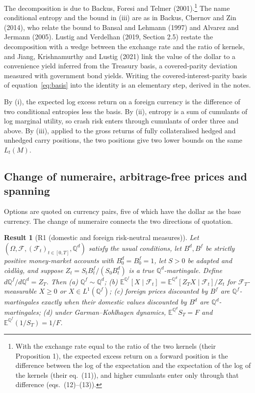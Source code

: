 \documentclass[11pt]{article}
\theoremstyle{result}
\newtheorem*{result}{Result}
\newcommand{\E}{\mathbb{E}}
\newcommand{\Q}{\mathbb{Q}}
\begin{document}
The decomposition is due to Backus, Foresi and Telmer (2001).\footnote{With the exchange rate equal to the ratio of the two kernels (their Proposition 1), the expected excess return on a forward position is the difference between the log of the expectation and the expectation of the log of the kernels (their eq.~(11)), and higher cumulants enter only through that difference (eqs.~(12)--(13)).} The name conditional entropy and the bound in (iii) are as in Backus, Chernov and Zin (2014), who relate the bound to Bansal and Lehmann (1997) and Alvarez and Jermann (2005). Lustig and Verdelhan (2019, Section 2.5) restate the decomposition with a wedge between the exchange rate and the ratio of kernels, and Jiang, Krishnamurthy and Lustig (2021) link the value of the dollar to a convenience yield inferred from the Treasury basis, a covered-parity deviation measured with government bond yields. Writing the covered-interest-parity basis of equation~\eqref{eq:basis} into the identity is an elementary step, derived in the notes.

By (i), the expected log excess return on a foreign currency is the difference of two conditional entropies less the basis. By (ii), entropy is a sum of cumulants of log marginal utility, so crash risk enters through cumulants of order three and above. By (iii), applied to the gross returns of fully collateralised hedged and unhedged carry positions, the two positions give two lower bounds on the same $L_t(M)$.

\subsection{Change of numeraire, arbitrage-free prices and spanning}

Options are quoted on currency pairs, five of which have the dollar as the base currency. The change of numeraire connects the two directions of quotation.

\begin{result}[R1 (domestic and foreign risk-neutral measures)]
Let $(\Omega,\mathcal F,(\mathcal F_t)_{t\in[0,T]},\Q^d)$ satisfy the usual conditions, let $B^d,B^f$ be strictly positive money-market accounts with $B^d_0=B^f_0=1$, let $S>0$ be adapted and c\`adl\`ag, and suppose $Z_t=S_tB^f_t/(S_0B^d_t)$ is a true $\Q^d$-martingale. Define $d\Q^f/d\Q^d=Z_T$. Then (a) $\Q^f\sim\Q^d$; (b) $\E^{\Q^f}[X\mid\mathcal F_t]=\E^{\Q^d}[Z_TX\mid\mathcal F_t]/Z_t$ for $\mathcal F_T$-measurable $X\ge0$ or $X\in L^1(\Q^f)$; (c) foreign prices discounted by $B^f$ are $\Q^f$-martingales exactly when their domestic values discounted by $B^d$ are $\Q^d$-martingales; (d) under Garman--Kohlhagen dynamics, $\E^{\Q^d}S_T=F$ and $\E^{\Q^f}(1/S_T)=1/F$.
\end{result}
\end{document}
